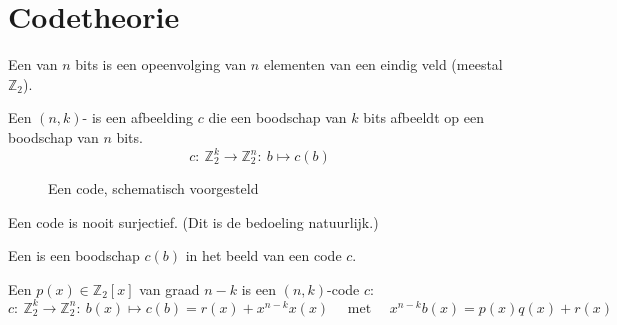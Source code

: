 \documentclass[main.tex]{subfiles}
\begin{document}
\section{Codetheorie}
\label{sec:codetheorie}

\begin{de}
  Een  van $n$ bits is een opeenvolging van $n$ elementen van een eindig veld (meestal $\mathbb{Z}_{2}$).
\end{de}

\begin{de}
  \label{de:code}
  Een $(n,k)$- is een afbeelding $c$ die een boodschap van $k$ bits afbeeldt op een boodschap van $n$ bits.
  \[ c:\ \mathbb{Z}_{2}^{k} \rightarrow \mathbb{Z}_{2}^{n}:\ b \mapsto c(b) \]

  \begin{figure}[H]
    \centering
    \caption{Een code, schematisch voorgesteld}
    \label{fig:code}
  \end{figure}
\end{de}

\begin{opm}
  Een code is nooit surjectief. (Dit is de bedoeling natuurlijk.)
\end{opm}

\begin{de}
  Een  is een boodschap $c(b)$ in het beeld van een code $c$.
\end{de}

\begin{de}
  Een  $p(x)\in \mathbb{Z}_{2}[x]$ van graad $n-k$ is een $(n,k)$-code $c$:
  \[ c:\ \mathbb{Z}_{2}^{k} \rightarrow \mathbb{Z}_{2}^{n}:\ b(x) \mapsto c(b) = r(x) + x^{n-k}x(x) \quad\text{ met }\quad x^{n-k}b(x) = p(x)q(x) + r(x) \]
\end{de}
\end{document}
